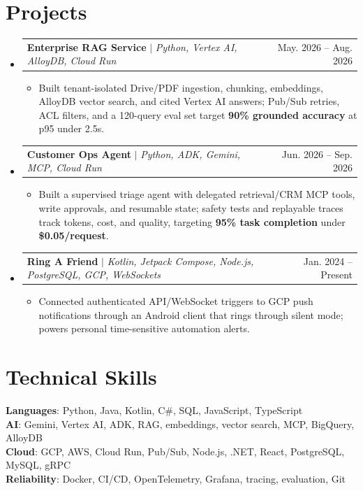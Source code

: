 \documentclass[letterpaper,11pt]{article}
\makeatletter
\newcommand{\resumeItem}[1]{
  \item\small{
    {#1 \vspace{-2pt}}
  }
}
\newcommand{\resumeProjectHeading}[2]{
    \item
    \begin{tabular*}{0.97\textwidth}{l@{\extracolsep{\fill}}r}
      \small#1 & #2 \\
    \end{tabular*}\vspace{-7pt}
}
\newcommand{\resumeSubHeadingListStart}{\begin{itemize}[leftmargin=0.15in, label={}]}
\newcommand{\resumeSubHeadingListEnd}{\end{itemize}}
\newcommand{\resumeItemListStart}{\begin{itemize}}
\newcommand{\resumeItemListEnd}{\end{itemize}\vspace{-5pt}}
\makeatother
\begin{document}
\section{Projects}
\resumeSubHeadingListStart
\resumeProjectHeading{\textbf{Enterprise RAG Service} $|$ \emph{Python, Vertex AI, AlloyDB, Cloud Run}}{May. 2026 -- Aug. 2026}
\resumeItemListStart
\resumeItem{Built tenant-isolated Drive/PDF ingestion, chunking, embeddings, AlloyDB vector search, and cited Vertex AI answers; Pub/Sub retries, ACL filters, and a 120-query eval set target \textbf{90\% grounded accuracy} at p95 under 2.5s.}
\resumeItemListEnd
\resumeProjectHeading{\textbf{Customer Ops Agent} $|$ \emph{Python, ADK, Gemini, MCP, Cloud Run}}{Jun. 2026 -- Sep. 2026}
\resumeItemListStart
\resumeItem{Built a supervised triage agent with delegated retrieval/CRM MCP tools, write approvals, and resumable state; safety tests and replayable traces track tokens, cost, and quality, targeting \textbf{95\% task completion} under \textbf{\$0.05/request}.}
\resumeItemListEnd
\resumeProjectHeading{\textbf{Ring A Friend} $|$ \emph{Kotlin, Jetpack Compose, Node.js, PostgreSQL, GCP, WebSockets}}{Jan. 2024 -- Present}
\resumeItemListStart
\resumeItem{Connected authenticated API/WebSocket triggers to GCP push notifications through an Android client that rings through silent mode; powers personal time-sensitive automation alerts.}
\resumeItemListEnd
\resumeSubHeadingListEnd

\section{Technical Skills}
\begin{itemize}[leftmargin=0.15in, label={}]
  \small{\item{
        \textbf{Languages}{: Python, Java, Kotlin, C\#, SQL, JavaScript, TypeScript} \\
        \textbf{AI}{: Gemini, Vertex AI, ADK, RAG, embeddings, vector search, MCP, BigQuery, AlloyDB} \\
        \textbf{Cloud}{: GCP, AWS, Cloud Run, Pub/Sub, Node.js, .NET, React, PostgreSQL, MySQL, gRPC} \\
        \textbf{Reliability}{: Docker, CI/CD, OpenTelemetry, Grafana, tracing, evaluation, Git}
        }}
\end{itemize}


\end{document}
